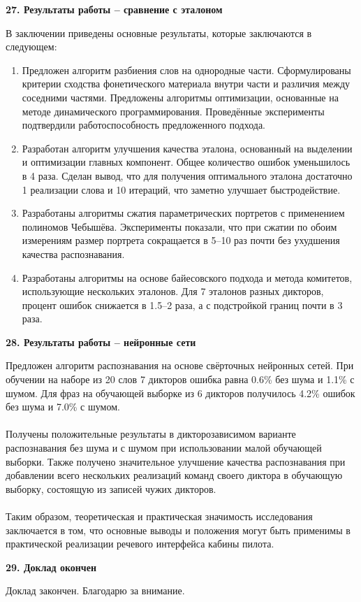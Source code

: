 \documentclass[a4paper, 12pt]{article}
\begin{document}
	\begin{center}
		\textbf{\large 27. Результаты работы – сравнение с эталоном}
	\end{center}	
	\noindent
	В заключении приведены основные результаты, которые заключаются в следующем:
	\begin{enumerate}
	\item Предложен алгоритм разбиения слов на однородные части. Сформулированы критерии сходства фонетического материала внутри части и различия между соседними частями. Предложены алгоритмы оптимизации, основанные на методе динамического программирования. Проведённые эксперименты подтвердили работоспособность предложенного подхода.
	\item Разработан алгоритм улучшения качества эталона, основанный на выделении и оптимизации главных компонент. Общее количество ошибок уменьшилось в 4 раза. Сделан вывод, что для получения оптимального эталона достаточно 1 реализации слова и 10 итераций, что заметно улучшает быстродействие.
	\item Разработаны алгоритмы сжатия параметрических портретов с применением полиномов Чебышёва. Эксперименты показали, что при сжатии по обоим измерениям размер портрета сокращается в 5–10 раз почти без ухудшения качества распознавания.
	\item Разработаны алгоритмы на основе байесовского подхода и метода комитетов, использующие нескольких эталонов. Для 7 эталонов разных дикторов, процент ошибок снижается в 1.5–2 раза, а с подстройкой границ почти в 3 раза.
	\end{enumerate}
	
	
	
	\begin{center}
		\textbf{\large 28. Результаты работы – нейронные сети}
	\end{center}	
	\noindent
	Предложен алгоритм распознавания на основе свёрточных нейронных сетей. При обучении на наборе из 20 слов 7 дикторов ошибка равна 0.6\% без шума и 1.1\% с шумом. Для фраз на обучающей выборке из 6 дикторов получилось 4.2\% ошибок без шума и 7.0\% с шумом.
	\\\\
	Получены положительные результаты в дикторозависимом варианте распознавания без шума и с шумом при использовании малой обучающей выборки. Также получено значительное улучшение качества распознавания при добавлении всего нескольких реализаций команд своего диктора в обучающую выборку, состоящую из записей чужих дикторов.
	\\\\
	Таким образом, теоретическая и практическая значимость исследования заключается в том, что основные выводы и положения могут быть применимы в практической реализации речевого интерфейса кабины пилота.
	
	
	
	\begin{center}
		\textbf{\large 29. Доклад окончен}
	\end{center}	
	
	Доклад закончен. Благодарю за внимание.
	
	
\end{document}
